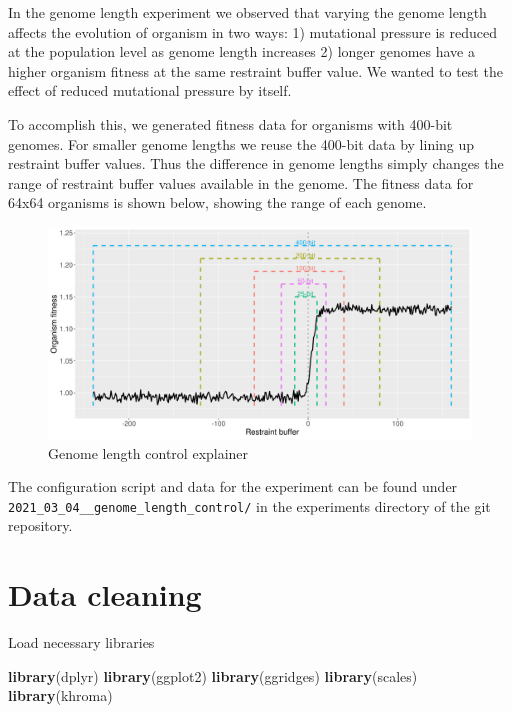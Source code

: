 \documentclass[]{book}
\newenvironment{Shaded}{\begin{snugshade}}{\end{snugshade}}
\newcommand{\KeywordTok}[1]{\textcolor[rgb]{0.13,0.29,0.53}{\textbf{#1}}}
\newcommand{\NormalTok}[1]{#1}
\begin{document}
In the genome length experiment we observed that varying the genome length affects the evolution of organism in two ways:
1) mutational pressure is reduced at the population level as genome length increases
2) longer genomes have a higher organism fitness at the same restraint buffer value.
We wanted to test the effect of reduced mutational pressure by itself.

To accomplish this, we generated fitness data for organisms with 400-bit genomes.
For smaller genome lengths we reuse the 400-bit data by lining up restraint buffer values.
Thus the difference in genome lengths simply changes the range of restraint buffer values available in the genome.
The fitness data for 64x64 organisms is shown below, showing the range of each genome.

\begin{figure}
\centering
\includegraphics{./genome_length_control/timing_control_explanation.png}
\caption{Genome length control explainer}
\end{figure}

The configuration script and data for the experiment can be found under \texttt{2021\_03\_04\_\_genome\_length\_control/} in the experiments directory of the git repository.

\hypertarget{data-cleaning-5}{%
\section{Data cleaning}\label{data-cleaning-5}}

Load necessary libraries

\begin{Shaded}
\begin{Highlighting}[]
\KeywordTok{library}\NormalTok{(dplyr)}
\KeywordTok{library}\NormalTok{(ggplot2)}
\KeywordTok{library}\NormalTok{(ggridges)}
\KeywordTok{library}\NormalTok{(scales)}
\KeywordTok{library}\NormalTok{(khroma)}
\end{Highlighting}
\end{Shaded}
\end{document}
